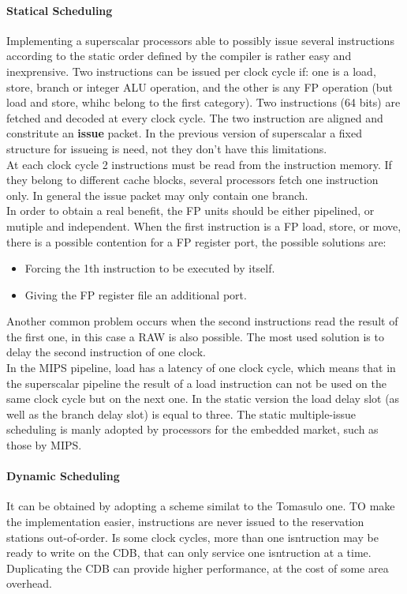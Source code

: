 \documentclass[12pt]{article}
\begin{document}
\paragraph{Statical Scheduling} Implementing a superscalar processors able to possibly issue several instructions according to the static order defined by the compiler is rather easy and inexprensive. Two instructions can be issued per clock cycle if: one is a load, store, branch or integer ALU operation, and the other is any FP operation (but load and store, whihc belong to the first category).
Two instructions (64 bits) are fetched and decoded at every clock cycle. The two instruction are aligned and constritute an \textbf{issue} packet. In the previous version of superscalar a fixed structure for issueing is need, not they don't have this limitations.\\
At each clock cycle 2 instructions must be read from the instruction memory. If they belong to different cache blocks, several processors fetch one instruction only. In general the issue packet may only contain one branch.\\
In order to obtain a real benefit, the FP units should be either pipelined, or mutiple and independent. When the first instruction is a FP load, store, or move, there is a possible contention for a FP register port, the possible solutions are:
\begin{itemize}
  \item Forcing the 1th instruction to be executed by itself.
  \item Giving the FP register file an additional port.
\end{itemize}
Another common problem occurs when the second instructions read the result of the first one, in this case a RAW is also possible. The most used solution is to delay the second instruction of one clock.\\

In the MIPS pipeline, load has a latency of one clock cycle, which means that in the superscalar pipeline the result of a load instruction can not be used on the same clock cycle but on the next one. In the static version the load delay slot (as well as the branch delay slot) is equal to three. The static multiple-issue scheduling is manly adopted by processors for the embedded market, such as those by MIPS.

\paragraph{Dynamic Scheduling} It can be obtained by adopting a scheme similat to the Tomasulo one. TO make the implementation easier, instructions are never issued to the reservation stations out-of-order. Is some clock cycles, more than one isntruction may be ready to write on the CDB, that can only service one isntruction at a time. Duplicating the CDB can provide higher performance, at the cost of some area overhead.
\end{document}
